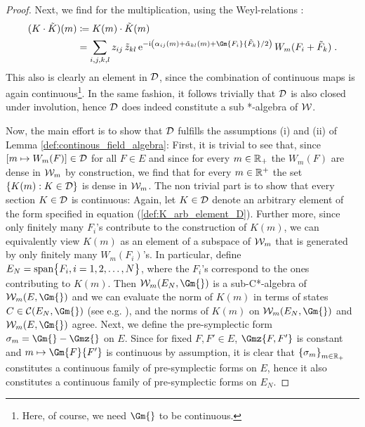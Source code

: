 \begin{proof}
	Next, we find for the multiplication, using the Weyl-relations :
	\begin{align}
		(K \cdot \tilde{K})(m) 
		&\coloneqq K(m) \cdot \tilde{K}(m) \notag \\
		&= \sum\limits_{i,j,k,l}z_{ij}\,\tilde{z}_{kl} \,\e^{-\i \left( \alpha_{ij}(m) + \tilde{\alpha}_{kl}(m)  + \Gm{F_i}{\tilde{F}_k}/2   \right) }\,W_m(F_i + \tilde{F}_k) \formspace.
	\end{align}
	This also is clearly an element in $\mathcal{D}$, since the combination of continuous maps is again continuous\footnote{Here, of course, we need $\Gm{}$ to be continuous.}.
	In the same fashion, it follows trivially that $\mathcal{D}$ is also closed under involution, hence $\mathcal{D}$ does indeed constitute a sub *-algebra of $\mathcal{W}$.\par
	Now, the main effort is to show that $\mathcal{D}$ fulfills the assumptions (i) and (ii) of Lemma \ref{def:continous_field_algebra}: 
	First, it is trivial to see that,  since $\left[ m \mapsto W_m(F) \right] \in \mathcal{D}$ for all $F\in E $ and since for every $m \in \mathbb{R}_+$ the $W_m(F)$ are dense in $\mathcal{W}_m$ by construction, 
	we find that for every $m \in \mathbb{R}^+$ the set $\left\{ K(m) : K \in \mathcal{D} \right\}$ is dense in $\mathcal{W}_m$.
	The non trivial part is to show that every section $K \in \mathcal{D}$ is continuous: 
	Again, let $K \in \mathcal{D}$ denote an arbitrary element of the form specified in equation (\ref{def:K_arb_element_D}).
	Further more, since only finitely many $F_i$'s contribute to the construction of $K(m)$, we can equivalently view $K(m)$ as an element of a subspace of $\mathcal{W}_m$ that is generated by only finitely many $W_m(F_i)$'s. In particular, define $E_N = \textrm{span}\big\{F_i, i=1,2,\dots,N \big\}$, where the $F_i$'s correspond to the ones contributing to $K(m)$. Then $\Wm(E_N,\Gm{})$ is a sub-C*-algebra of $\Wm(E,\Gm{})$  and we can evaluate the norm of $K(m)$ in terms of states $C \in \C (E_N, \Gm{})$ (see e.g. \cite[Section III.B]{rieckers_honegger_construction}), and the norms of $K(m)$ on $\Wm(E_N,\Gm{})$ and $\Wm(E,\Gm{})$ agree.
		Next, we define the pre-symplectic form $\sigma_m = \Gm{} - \Gmz{}$ on $E$. Since for fixed $F,F' \in E$, $\Gmz{F,F'}$ is constant and $m \mapsto \Gm{F}{F'}$ is continuous by assumption, it is clear that $\left\{\sigma_m \right\}_{m \in \mathbb{R}_+}$ constitutes a continuous family of pre-symplectic forms on $E$, hence it also constitutes a continuous family of pre-symplectic forms on $E_N$. 

\end{proof}
